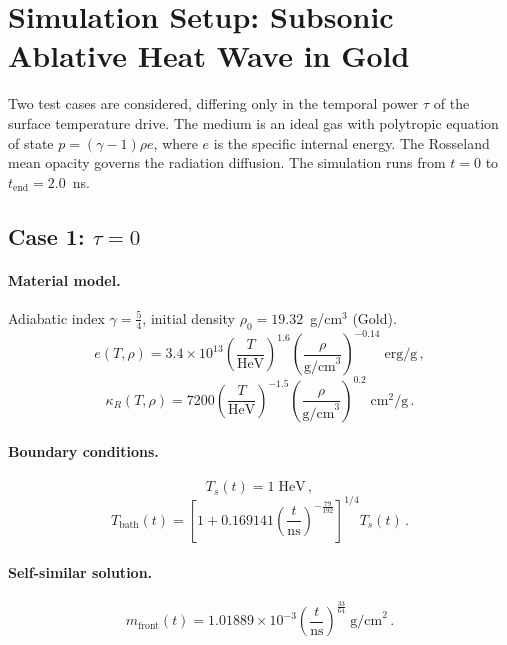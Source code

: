 \documentclass[11pt]{article}
\newcommand{\HeV}{\text{HeV}}
\begin{document}
\section*{Simulation Setup: Subsonic Ablative Heat Wave in Gold}

Two test cases are considered, differing only in the temporal power
$\tau$ of the surface temperature drive.
The medium is an ideal gas with polytropic equation of state
$p=(\gamma-1)\rho e$, where $e$ is the specific
internal energy.
The Rosseland mean opacity governs the radiation diffusion.
The simulation runs from $t=0$ to $t_\text{end}=2.0$~ns.

\subsection*{Case 1: $\tau=0$}

\paragraph{Material model.}
Adiabatic index $\gamma=\frac{5}{4}$, initial density
$\rho_0=19.32$~g/cm$^3$ (Gold).
\begin{equation}
  e(T,\rho)
  = 3.4\times10^{13}
    \left(\frac{T}{\HeV}\right)^{1.6}
    \left(\frac{\rho}{\text{g/cm}^3}\right)^{-0.14}
  \;\text{erg/g}\,,
\end{equation}
\begin{equation}
  \kappa_R(T,\rho)
  = 7200
    \left(\frac{T}{\HeV}\right)^{-1.5}
    \left(\frac{\rho}{\text{g/cm}^3}\right)^{0.2}
  \;\text{cm}^2\text{/g}\,.
\end{equation}

\paragraph{Boundary conditions.}
\begin{equation}
  T_s(t)
  = 1\;\HeV\,,
\end{equation}
\begin{equation}
  T_\text{bath}(t)
  = \left[
      1 + 0.169141\left(\frac{t}{\text{ns}}\right)^{-\frac{79}{192}}
    \right]^{1/4}
  T_s(t)\,.
\end{equation}

\paragraph{Self-similar solution.}
\begin{equation}
  m_\text{front}(t)
  = 1.01889\times10^{-3}
    \left(\frac{t}{\text{ns}}\right)^{\frac{33}{64}}
  \;\text{g/cm}^2\,.
\end{equation}
\end{document}
